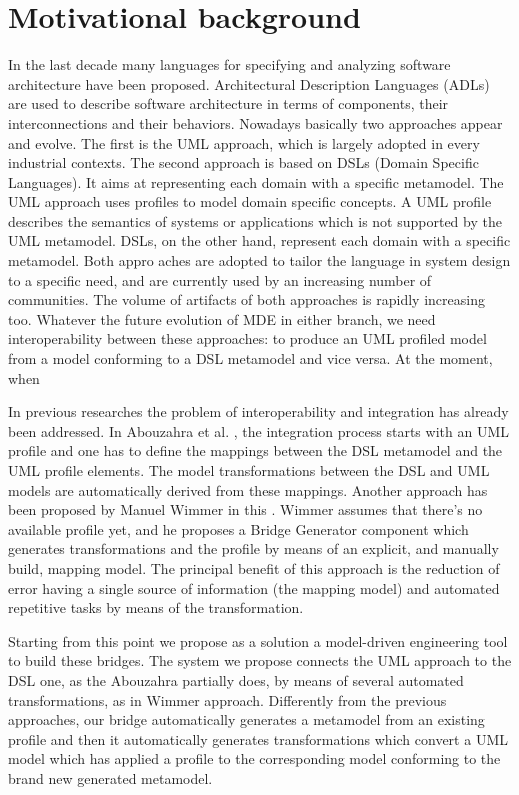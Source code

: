 \section{Motivational background}\label{sec:motivation}



In the last decade many languages for specifying and analyzing software architecture have been proposed. Architectural Description Languages (ADLs) are used to describe software architecture in terms of components, their interconnections and their behaviors. Nowadays basically two approaches appear and evolve. The first is the UML approach, which is largely adopted in every industrial contexts. The second approach is based on DSLs (Domain Specific Languages). It aims at representing each domain with a specific metamodel. The UML approach uses profiles to model domain specific concepts. A UML profile describes the semantics of systems or applications which is not supported by the UML metamodel. DSLs, on the other hand, represent each domain with a specific metamodel. Both appro
aches are adopted to tailor the language in system design to a specific need, and are currently used by an increasing number of communities. The volume of artifacts of both approaches is rapidly increasing too. Whatever the future evolution of MDE in either branch, we need interoperability between these approaches: to produce an UML profiled model from a model conforming to a DSL metamodel and vice versa. At the moment, when 


In previous researches the problem of interoperability and integration has already been addressed. In Abouzahra et al. \cite{Abouzahra}, the integration process starts with an UML profile and one has to define the mappings between the DSL metamodel and the UML profile elements. The model transformations between the DSL and UML models are automatically derived from these mappings. Another approach has been proposed by Manuel Wimmer in this \cite{Wimmer}. Wimmer assumes that there's no available profile yet, and he proposes a Bridge Generator component which generates transformations and the profile by means of an explicit, and manually build, mapping model. The principal benefit of this approach is the reduction of error having a single source of information (the mapping model) and automated repetitive tasks by means of the transformation.


Starting from this point we propose as a solution a model-driven engineering tool to build these bridges. The system we propose connects the UML approach to the DSL one, as the Abouzahra partially does, by means of several automated transformations, as in Wimmer approach. Differently from the previous approaches, our bridge automatically generates a metamodel from an existing profile and then it automatically generates transformations which convert a UML model which has applied a profile to the corresponding model conforming to the brand new generated metamodel.

